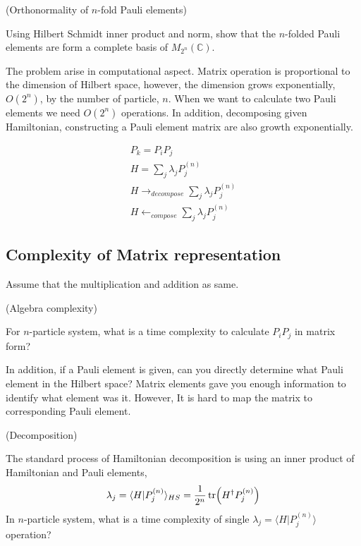 \begin{exercise}(Orthonormality of $n$-fold Pauli elements)

    Using Hilbert Schmidt inner product and norm, show that the $n$-folded Pauli elements are form a complete basis of
    $M_{2^n}(\mathbb{C})$.
\end{exercise}

The problem arise in computational aspect. 
Matrix operation is proportional to the dimension of Hilbert space, however, the dimension grows exponentially, $O(2^n)$,
by the number of particle, $n$. When we want to calculate two Pauli elements we need $O(2^n)$ operations.
In addition, decomposing given Hamiltonian, constructing a Pauli element matrix are also growth exponentially.


\begin{align*}
    P_k = P_i P_j\\
    H = \sum_j \lambda_j P_j^{(n)} \\
    H \rightarrow_{decompose} \sum_j \lambda_j P_j^{(n)}\\
    H \leftarrow_{compose} \sum_j \lambda_j P_j^{(n)}
\end{align*}

\subsection*{Complexity of Matrix representation}

Assume that the multiplication and addition as same.

\begin{exercise}(Algebra complexity)

    For $n$-particle system, what is a time complexity to calculate $P_i P_j$ in matrix form?
\end{exercise}

In addition, if a Pauli element is given, can you directly determine what Pauli element in the Hilbert space?
Matrix elements gave you enough information to identify what element was it. 
However, It is hard to map the matrix to corresponding Pauli element.

\begin{exercise}(Decomposition)

    The standard process of Hamiltonian decomposition is using an inner product of Hamiltonian and Pauli elements,
    \begin{equation*}
        \lambda_j = \langle H | P_j^{(n)} \rangle_{HS} = \frac{1}{2^n} \tr(H^\dagger P_j^{(n)})
    \end{equation*}
    In $n$-particle system, what is a time complexity of single $\lambda_j = \langle H | P_j^{(n)} \rangle$ operation?
\end{exercise}

